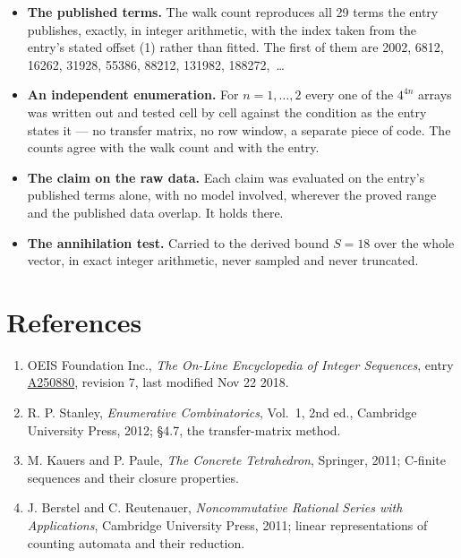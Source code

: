 \documentclass[11pt]{article}
\theoremstyle{definition}
\begin{document}
\begin{itemize}

\item {\bfseries The published terms.} The walk count reproduces all 29 terms the entry publishes, exactly, in integer arithmetic, with the index taken from the entry's stated offset (1) rather than fitted. The first of them are 2002, 6812, 16262, 31928, 55386, 88212, 131982, 188272,~\dots

\item {\bfseries An independent enumeration.} For $n = 1,\dots,2$ every one of the $4^{4n}$ arrays was written out and tested cell by cell against the condition as the entry states it --- no transfer matrix, no row window, a separate piece of code. The counts agree with the walk count and with the entry.

\item {\bfseries The claim on the raw data.} Each claim was evaluated on the entry's published terms alone, with no model involved, wherever the proved range and the published data overlap. It holds there.

\item {\bfseries The annihilation test.} Carried to the derived bound $S = 18$ over the whole vector, in exact integer arithmetic, never sampled and never truncated.

\end{itemize}

\section{References}

\begin{enumerate}

\item OEIS Foundation Inc., \emph{The On-Line Encyclopedia of Integer Sequences}, entry \href{https://oeis.org/A250880}{A250880}, revision 7, last modified Nov 22 2018.

\item R. P. Stanley, \emph{Enumerative Combinatorics}, Vol.~1, 2nd ed., Cambridge University Press, 2012; \S4.7, the transfer-matrix method.

\item M. Kauers and P. Paule, \emph{The Concrete Tetrahedron}, Springer, 2011; C-finite sequences and their closure properties.

\item J. Berstel and C. Reutenauer, \emph{Noncommutative Rational Series with Applications}, Cambridge University Press, 2011; linear representations of counting automata and their reduction.

\end{enumerate}
\end{document}
